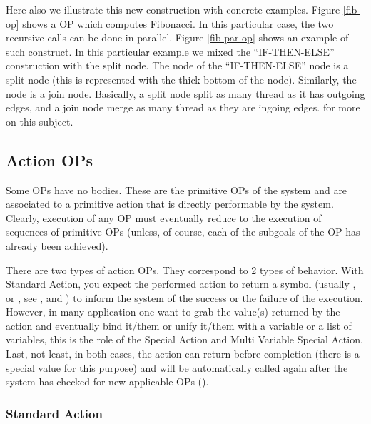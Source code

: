 Here also we illustrate this new construction with concrete examples.
Figure \ref{fib-op} shows a OP which computes Fibonacci. In this particular
case, the two recursive calls can be done in parallel. Figure \ref{fib-par-op}
shows an example of such construct. In this particular example we mixed the
``IF-THEN-ELSE'' construction with the split node. The  node of the
 ``IF-THEN-ELSE'' node is a split node (this is represented with the
thick bottom of the node). Similarly, the  node is a join node.
Basically, a split node split as many thread as it has outgoing edges, and a
join node merge as many thread as they are ingoing edges.  for more on this subject.

\subsection{Action OPs}

Some OPs have no bodies.  These are the primitive OPs of the system and
are associated to a primitive action that is directly
performable by the system.  Clearly, execution of any OP must eventually
reduce to the execution of sequences of primitive OPs (unless, of
course, each of the subgoals of the OP has already been achieved).

There are two types of action OPs. They correspond to 2 types of behavior.
With Standard Action, you expect the performed action to return a symbol
(usually ,  or , see ,
and ) to inform the system of the success or the
failure of the execution. However, in many application one want to grab the
value(s) returned by the action and eventually bind it/them or unify it/them
with a variable or a list of variables, this is the role of the Special Action
and Multi Variable Special Action. Last, not least, in both cases, the action
can return before completion (there is a special value  for this
purpose) and will be automatically called again after the system has checked
for new applicable OPs ().



\subsubsection{Standard Action}


